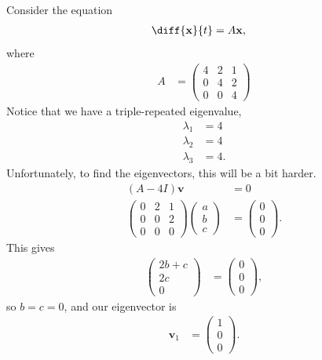 \documentclass[10pt]{mypackage}
\begin{document}
\begin{example}
  Consider the equation
  \begin{align*}
    \diff{\mathbf{x}}{t} &= A\mathbf{x},
  \end{align*}
  where
  \begin{align*}
    A &= \begin{pmatrix}4 & 2 & 1 \\ 0 & 4 & 2 \\ 0 & 0 & 4\end{pmatrix} \label{eq:generalized_eigenvalues_example}\tag{$A$}
  \end{align*}
  Notice that we have a triple-repeated eigenvalue,
  \begin{align*}
    \lambda_1 &= 4\\
    \lambda_2 &= 4\\
    \lambda_3 &= 4.
  \end{align*}
  Unfortunately, to find the eigenvectors, this will be a bit harder.
  \begin{align*}
    \left( A - 4I \right)\mathbf{v} &= 0\\
    \begin{pmatrix}0 & 2 & 1 \\ 0 & 0 & 2 \\ 0 & 0 & 0\end{pmatrix} \begin{pmatrix}a\\b\\c\end{pmatrix} &= \begin{pmatrix}0\\0\\0\end{pmatrix}.
  \end{align*}
  This gives
  \begin{align*}
    \begin{pmatrix}2b + c \\ 2c \\ 0 \end{pmatrix} &= \begin{pmatrix}0\\0\\0\end{pmatrix},
  \end{align*}
  so $b = c = 0$, and our eigenvector is
  \begin{align*}
    \mathbf{v}_1 &= \begin{pmatrix}1\\0\\0\end{pmatrix}.

\end{align*}
\end{example}
\end{document}
